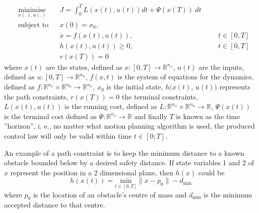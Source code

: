 \begin{equation}
    \begin{aligned}
    & \underset{x(.),u(.)}{\text{minimise}} && J = \int_0^T L(x(t),u(t))dt + \Psi (x(T)) \ dt\\
    & \text{subject to}  && x(0) = x_0, \\
        & && \dot{x} = f(x(t), u(t)), &&& t \in [0,T] \\
        & && h(x(t),u(t)) \geq 0, &&&  t \in [0,T] \\
        & && r(x(T)) = 0 
    \end{aligned}
    \label{eq:general_cost}
\end{equation}
where $x(t)$ are the states, defined as $x:[0,T]\rightarrow \mathbb{R}^{n_x}$, $u(t)$ are the inputs, defined as $u:[0,T]\rightarrow \mathbb{R}^{n_u}$, $f(x,t)$ is the system of equations for the dynamics, defined as $f:\mathbb{R}^{n_x}\times \mathbb{R}^{n_u}\rightarrow \mathbb{R}^{n_x}$, $x_0$ is the initial state, $h(x(t)$, $u(t))$ represents the path constraints, $r(x(T))=0$ the terminal constraints, $L(x(t),u(t))$ is the running cost, defined as $L:\mathbb{R}^{n_x}\times \mathbb{R}^{n_u}\rightarrow \mathbb{R}$, $\Psi(x(t))$ is the terminal cost defined as $\Psi:\mathbb{R}^{n_x} \rightarrow \mathbb{R}$ and finally $T$ is known as the time ”horizon”, i. e., no matter what motion planning algorithm is used, the produced control law will only be valid within time $t\in[0;T]$.

\par An example of a path constraint is to keep the minimum distance to a known obstacle bounded below by a desired safety distance. If state variables 1 and 2 of $x$ represent the position in a 2 dimensional plane, then $h(x)$ could be
\begin{equation}
    \label{eq:example_constr}
    h(x(t)) = \underset{t\in[0,T]}{\text{min}}\lVert x - p_0 \rVert - d_{\text{min}}
\end{equation}
where $p_0$ is the location of an obstacle's centre of mass and $d_{\text{min}}$ is the minimum accepted distance to that centre.

